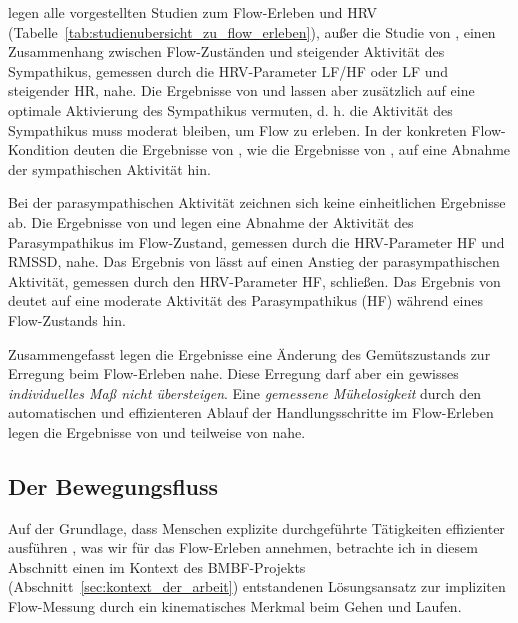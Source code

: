 legen alle vorgestellten Studien zum Flow-Erleben und \ac{HRV} (Tabelle~\ref{tab:studienubersicht_zu_flow_erleben}), außer die Studie von \cite{Harmat2015}, einen Zusammenhang zwischen Flow-Zuständen und steigender Aktivität des Sympathikus, gemessen durch die \ac{HRV}-Parameter \acs{LF}/\acs{HF} oder \acs{LF} und steigender HR, nahe. Die Ergebnisse von \citet{Peifer2014} und \citet{Tozman2015} lassen aber zusätzlich auf eine optimale Aktivierung des Sympathikus vermuten, d. h. die Aktivität des Sympathikus muss moderat bleiben, um Flow zu erleben. In der konkreten Flow-Kondition deuten die Ergebnisse von \citet{Tozman2015}, wie die Ergebnisse von \cite{Harmat2015}, auf eine Abnahme der sympathischen Aktivität hin.

Bei der parasympathischen Aktivität zeichnen sich keine einheitlichen Ergebnisse ab. Die Ergebnisse von \citet{deManzano2010} und \citet{Keller2011} legen eine Abnahme der Aktivität des Parasympathikus im Flow-Zustand, gemessen durch die \ac{HRV}-Parameter \acs{HF} und \acs{RMSSD}, nahe. Das Ergebnis von \citet{Peifer2014} lässt auf einen Anstieg der parasympathischen Aktivität, gemessen durch den \ac{HRV}-Parameter \acs{HF}, schließen. Das Ergebnis von \citet{Tozman2015} deutet auf eine moderate Aktivität des Parasympathikus (\acs{HF}) während eines Flow-Zustands hin.

Zusammengefasst legen die Ergebnisse eine Änderung des Gemütszustands zur Erregung beim Flow-Erleben nahe. Diese Erregung darf aber ein gewisses \emph{individuelles Maß nicht übersteigen}. Eine \emph{gemessene Mühelosigkeit} durch den automatischen und effizienteren Ablauf der Handlungsschritte im Flow-Erleben legen die Ergebnisse von \citet{Peifer2014} und teilweise von \citet{Tozman2015, Harmat2015} nahe.

\subsection{Der Bewegungsfluss} 

\label{ssub:der_bewegungsfluss}

Auf der Grundlage, dass Menschen explizite durchgeführte Tätigkeiten effizienter ausführen \citep[][S.~753]{Dietrich2004}, was wir für das Flow-Erleben annehmen, betrachte ich in diesem Abschnitt einen im Kontext des \acs{BMBF}-Projekts (Abschnitt~\ref{sec:kontext_der_arbeit}) entstandenen Lösungsansatz zur impliziten Flow-Messung durch ein kinematisches Merkmal beim Gehen und Laufen.

